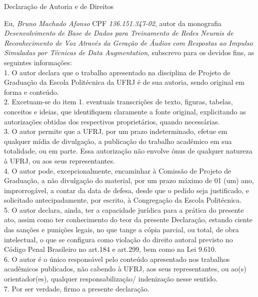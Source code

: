 \begin{center}
Declaração de Autoria e de Direitos
\end{center}

\vspace{0.4cm}

Eu, \emph{Bruno Machado Afonso} CPF \emph{136.151.347-02}, autor da monografia \emph{Desenvolvimento de Base de Dados para Treinamento de Redes Neurais de Reconhecimento de Voz Através da Geração de Áudios com Respostas
ao Impulso Simuladas por Técnicas de Data Augmentation}, subscrevo para os devidos fins, as seguintes informações:\\
1. O autor declara que o trabalho apresentado na disciplina de Projeto de Graduação da Escola Politécnica da UFRJ é de sua autoria, sendo original em forma e conteúdo.\\
2. Excetuam-se do item 1. eventuais transcrições de texto, figuras, tabelas, conceitos e ideias, que identifiquem claramente a fonte original, explicitando as autorizações obtidas dos respectivos proprietários, quando necessárias.\\
3. O autor permite que a UFRJ, por um prazo indeterminado, efetue em qualquer mídia de divulgação, a publicação do trabalho acadêmico em sua totalidade, ou em parte. Essa autorização não envolve ônus de qualquer natureza à UFRJ, ou aos seus representantes.\\
4. O autor pode, excepcionalmente, encaminhar à Comissão de Projeto de Graduação, a não divulgação do material, por um prazo máximo de 01 (um) ano, improrrogável, a contar da data de defesa, desde que o pedido seja justificado, e solicitado antecipadamente, por escrito, à Congregação da Escola Politécnica.\\
5. O autor declara, ainda, ter a capacidade jurídica para a prática do presente ato, assim como ter conhecimento do teor da presente Declaração, estando ciente das sanções e punições legais, no que tange a cópia parcial, ou total, de obra intelectual, o que se configura como violação do direito autoral previsto no Código Penal Brasileiro no art.184 e art.299, bem como na Lei 9.610.\\
6. O autor é o único responsável pelo conteúdo apresentado nos trabalhos acadêmicos publicados, não cabendo à UFRJ, aos seus representantes,  ou ao(s) orientador(es), qualquer responsabilização/ indenização nesse sentido.\\
7. Por ser verdade, firmo a presente declaração.\\

